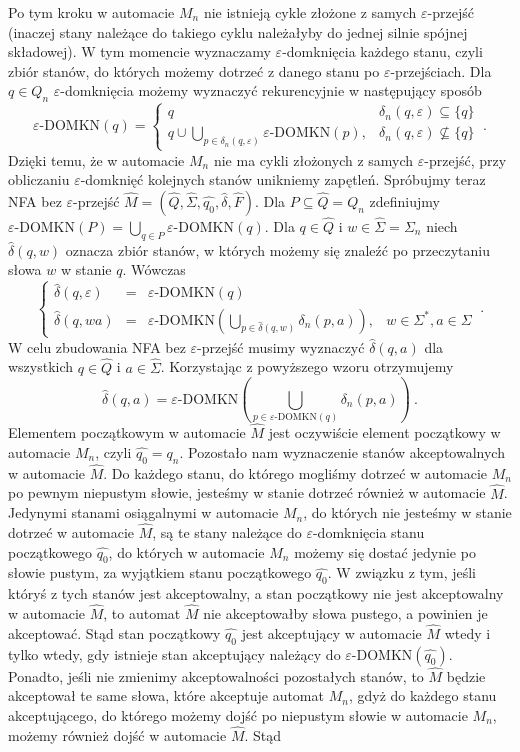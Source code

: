 Po tym kroku w automacie $M_n$ nie istnieją cykle złożone z samych $\varepsilon$-przejść (inaczej stany należące do takiego cyklu należałyby do jednej silnie spójnej składowej). W tym momencie wyznaczamy $\varepsilon$-domknięcia każdego stanu, czyli zbiór stanów, do których możemy dotrzeć z danego stanu po $\varepsilon$-przejściach. Dla $q\in Q_n$ $\varepsilon$-domknięcia możemy wyznaczyć rekurencyjnie w następujący sposób
$$\varepsilon\text{-DOMKN}(q)=\left\{
        \begin{array}{rl}
            q & \delta_n(q,\varepsilon)\subseteq\{q\}\\
            q\cup\bigcup_{p\in\delta_n(q,\varepsilon)}{\varepsilon\text{-DOMKN}(p)}, & \delta_n(q,\varepsilon)\nsubseteq\{q\}
        \end{array}
        \right.~.$$
Dzięki temu, że w automacie $M_n$ nie ma cykli złożonych z samych $\varepsilon$-przejść, przy obliczaniu $\varepsilon$-domknięć kolejnych stanów unikniemy zapętleń. Spróbujmy teraz NFA bez $\varepsilon$-przejść $\hat{M}=(\hat{Q},\hat{\Sigma},\hat{q_0},\hat{\delta},\hat{F})$. Dla $P\subseteq \hat{Q}=Q_n$ zdefiniujmy $\varepsilon\text{-DOMKN}(P)=\bigcup_{q\in P}{\varepsilon\text{-DOMKN}(q)}$. Dla $q\in \hat{Q}$ i $w\in\hat{\Sigma}=\Sigma_n$ niech $\hat{\delta}(q,w)$ oznacza zbiór stanów, w których możemy się znaleźć po przeczytaniu słowa $w$ w stanie $q$. Wówczas
$$\left\{
\begin{array}{rcll}
    \hat{\delta}(q,\varepsilon)&=&\varepsilon\text{-DOMKN}(q)\\
    \hat{\delta}(q,wa)&=&\varepsilon\text{-DOMKN}\left(\bigcup_{p\in\hat{\delta}(q,w)}{\delta_n(p,a)}\right), & w\in\Sigma^*,a\in\Sigma
\end{array}
\right.~.$$
W celu zbudowania NFA bez $\varepsilon$-przejść musimy wyznaczyć $\hat{\delta}(q,a)$ dla wszystkich $q\in \hat{Q}$ i $a\in\hat{\Sigma}$. Korzystając z powyższego wzoru otrzymujemy
$$\hat{\delta}(q,a)=\varepsilon\text{-DOMKN}\left(\bigcup_{p\in\varepsilon\text{-DOMKN}(q)}{\delta_n(p,a)}\right)~.$$
Elementem początkowym w automacie $\hat{M}$ jest oczywiście element początkowy w automacie $M_n$, czyli $\hat{q_0}=q_n$. Pozostało nam wyznaczenie stanów akceptowalnych w automacie $\hat{M}$. Do każdego stanu, do którego mogliśmy dotrzeć w automacie $M_n$ po pewnym niepustym słowie, jesteśmy w stanie dotrzeć również w automacie $\hat{M}$. Jedynymi stanami osiągalnymi w automacie $M_n$, do których nie jesteśmy w stanie dotrzeć w automacie $\hat{M}$, są te stany należące do $\varepsilon$-domknięcia stanu początkowego $\hat{q_0}$, do których w automacie $M_n$ możemy się dostać jedynie po słowie pustym, za wyjątkiem stanu początkowego $\hat{q_0}$. W związku z tym, jeśli któryś z tych stanów jest akceptowalny, a stan początkowy nie jest akceptowalny w automacie $\hat{M}$, to automat $\hat{M}$ nie akceptowałby słowa pustego, a powinien je akceptować. Stąd stan początkowy $\hat{q_0}$ jest akceptujący w automacie $\hat{M}$ wtedy i tylko wtedy, gdy istnieje stan akceptujący należący do $\varepsilon\text{-DOMKN}(\hat{q_0})$. Ponadto, jeśli nie zmienimy akceptowalności pozostałych stanów, to $\hat{M}$ będzie akceptował te same słowa, które akceptuje automat $M_n$, gdyż do każdego stanu akceptującego, do którego możemy dojść po niepustym słowie w automacie $M_n$, możemy również dojść w automacie $\hat{M}$. Stąd
